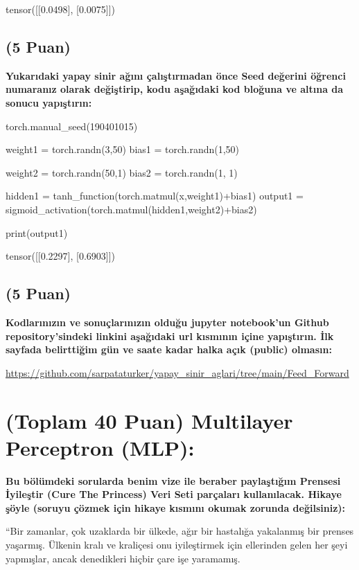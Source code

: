 \documentclass[11pt]{article}
\begin{document}
tensor([[0.0498],
        [0.0075]])

\subsection{(5 Puan)} \textbf{Yukarıdaki yapay sinir ağını çalıştırmadan önce Seed değerini öğrenci numaranız olarak değiştirip, kodu aşağıdaki kod bloğuna ve altına da sonucu yapıştırın:}

\begin{python}
torch.manual_seed(190401015)

weight1 = torch.randn(3,50) 
bias1 = torch.randn(1,50) 

weight2 = torch.randn(50,1)
bias2 = torch.randn(1, 1)

hidden1 = tanh_function(torch.matmul(x,weight1)+bias1)
output1 = sigmoid_activation(torch.matmul(hidden1,weight2)+bias2)

print(output1)
\end{python}

tensor([[0.2297],
        [0.6903]])

\subsection{(5 Puan)} \textbf{Kodlarınızın ve sonuçlarınızın olduğu jupyter notebook'un Github repository'sindeki linkini aşağıdaki url kısmının içine yapıştırın. İlk sayfada belirttiğim gün ve saate kadar halka açık (public) olmasın:}

\url{https://github.com/sarpataturker/yapay_sinir_aglari/tree/main/Feed_Forward}

\section{(Toplam 40 Puan) Multilayer Perceptron (MLP):} 
\textbf{Bu bölümdeki sorularda benim vize ile beraber paylaştığım Prensesi İyileştir (Cure The Princess) Veri Seti parçaları kullanılacak. Hikaye şöyle (soruyu çözmek için hikaye kısmını okumak zorunda değilsiniz):} 

``Bir zamanlar, çok uzaklarda bir ülkede, ağır bir hastalığa yakalanmış bir prenses yaşarmış. Ülkenin kralı ve kraliçesi onu iyileştirmek için ellerinden gelen her şeyi yapmışlar, ancak denedikleri hiçbir çare işe yaramamış.
\end{document}
